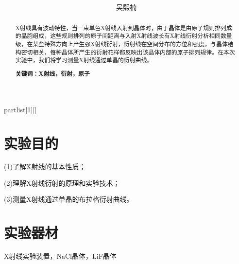 \documentclass[UTF8]{ctexart}
\author{
	吴熙楠}
\title{
	\heiti{X射线衍射实验报告}
}
\begin{document}
	\maketitle
	\newtheorem{definition}{定义}[subsection]
	\newtheorem{function}{公式}[subsection]
	\newtheorem{summary}{小结}[subsection]
	\newtheorem{deduction}{推论}[subsection]
	\newtheorem{property}{性质}[subsection]
	\newtheorem{theo}{定理}[subsection]
	\newtheorem{step}{步骤}[subsection]
	\newtheorem{remark}{注记}[subsection]
	\newtheorem{proof}{证明}[subsection]
	\newenvironment{Theorem}[1][]{\par\noindent\textbf{定理}(#1)\quad}{\par}
	\newcommand{\rbra}[1]{\left( #1 \right)}
	\newcommand{\sbra}[1]{\left[ #1 \right]}
	\newcommand{\cbra}[1]{\left\{ #1 \right\}}
	\newcommand{\pbra}[1]{\left< #1 \right>}
	\newcommand{\abs}[1]{\left| #1 \right|}
	\newcommand{\fs}[2]{\displaystyle\frac{#1}{#2}}
	
	\newenvironment{myproof}{{\color{blue}证：}}
	
	\newenvironment{partlist}[1][]
	{\begin{enumerate}[itemsep=0pt, label=(\arabic*), wide, labelindent=\parindent, listparindent=\parindent, #1]}
		{\end{enumerate}}
	
	\renewcommand{\contentsname}{目录} %
	\tableofcontents
	\newpage
	\renewcommand{\abstractname}{\large 摘要\\}
	\begin{abstract}
		X射线具有波动特性，当一束单色X射线入射到晶体时，由于晶体是由原子规则排列成的晶胞组成，这些规则排列的原子间距离与入射X射线波长有X射线衍射分析相同数量级，在某些特殊方向上产生强X射线衍射，衍射线在空间分布的方位和强度，与晶体结构密切相关，每种晶体所产生的衍射花样都反映出该晶体内部的原子排列规律。在本次实验中，我们将学习测量X射线通过单晶的衍射曲线。
		
		\textbf{关键词：X射线，衍射，原子}
	\end{abstract}
	\section{实验目的}
	(1)了解X射线的基本性质；
	\par (2)理解X射线衍射的原理和实验技术；
	\par (3)测量X射线通过单晶的布拉格衍射曲线。
	\section{实验器材}
	X射线实验装置，NaCl晶体，LiF晶体
\end{document}
